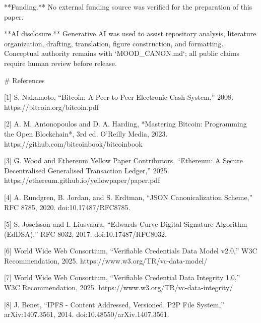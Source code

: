 \documentclass[10pt,a4paper]{article}
\begin{document}
**Funding.** No external funding source was verified for the preparation of this paper.

**AI disclosure.** Generative AI was used to assist repository analysis, literature organization, drafting, translation, figure construction, and formatting. Conceptual authority remains with `MOOD_CANON.md`; all public claims require human review before release.

\# References

[1] S. Nakamoto, “Bitcoin: A Peer-to-Peer Electronic Cash System,” 2008. https://bitcoin.org/bitcoin.pdf

[2] A. M. Antonopoulos and D. A. Harding, *Mastering Bitcoin: Programming the Open Blockchain*, 3rd ed. O'Reilly Media, 2023. https://github.com/bitcoinbook/bitcoinbook

[3] G. Wood and Ethereum Yellow Paper Contributors, “Ethereum: A Secure Decentralised Generalised Transaction Ledger,” 2025. https://ethereum.github.io/yellowpaper/paper.pdf

[4] A. Rundgren, B. Jordan, and S. Erdtman, “JSON Canonicalization Scheme,” RFC 8785, 2020. doi:10.17487/RFC8785.

[5] S. Josefsson and I. Liusvaara, “Edwards-Curve Digital Signature Algorithm (EdDSA),” RFC 8032, 2017. doi:10.17487/RFC8032.

[6] World Wide Web Consortium, “Verifiable Credentials Data Model v2.0,” W3C Recommendation, 2025. https://www.w3.org/TR/vc-data-model/

[7] World Wide Web Consortium, “Verifiable Credential Data Integrity 1.0,” W3C Recommendation, 2025. https://www.w3.org/TR/vc-data-integrity/

[8] J. Benet, “IPFS - Content Addressed, Versioned, P2P File System,” arXiv:1407.3561, 2014. doi:10.48550/arXiv.1407.3561.
\end{document}
